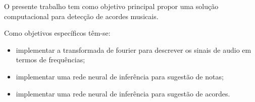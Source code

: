 O presente trabalho tem como objetivo principal propor uma solução computacional para detecção de acordes musicais.

Como objetivos específicos têm-se:

 	\begin{itemize}
        \item implementar a transformada de fourier para descrever os sinais de audio em termos de frequências;
        \item implementar uma rede neural de inferência para sugestão de notas;
        \item implementar uma rede neural de inferência para sugestão de acordes.
    \end{itemize}

